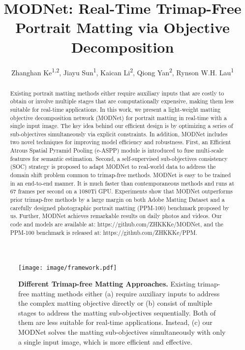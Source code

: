 \documentclass[letterpaper]{article} \usepackage{aaai22}  \usepackage{times}  \usepackage{helvet}  \usepackage{courier}  \usepackage[hyphens]{url}  \usepackage{graphicx} \urlstyle{rm} \def\UrlFont{\rm}  \usepackage{natbib}  \usepackage{caption} \usepackage{booktabs}
\title{MODNet: Real-Time Trimap-Free Portrait Matting via Objective Decomposition}
\author{
    Zhanghan Ke\textsuperscript{\rm 1,2},\;
    Jiayu Sun\textsuperscript{\rm 1},\;
    Kaican Li\textsuperscript{\rm 2},\;
    Qiong Yan\textsuperscript{\rm 2},\;
    Rynson W.H. Lau\textsuperscript{\rm 1}
}
\begin{document}
\maketitle

\begin{abstract}
Existing portrait matting methods either require auxiliary inputs that are costly to obtain or involve multiple stages that are computationally expensive, making them less suitable for real-time applications. 
In this work, we present a light-weight matting objective decomposition network (MODNet) for portrait matting in real-time with a single input image. 
The key idea behind our efficient design is by optimizing a series of sub-objectives simultaneously via explicit constraints. 
In addition, MODNet includes two novel techniques for improving model efficiency and robustness.
First, an Efficient Atrous Spatial Pyramid Pooling (e-ASPP) module is introduced to fuse multi-scale features for semantic estimation. Second, a self-supervised sub-objectives consistency (SOC) strategy is proposed to adapt MODNet to real-world data to address the domain shift problem common to trimap-free methods.
MODNet is easy to be trained in an end-to-end manner. It is much faster than contemporaneous methods and runs at 67 frames per second on a 1080Ti GPU. Experiments show that MODNet outperforms prior trimap-free methods by a large margin on both Adobe Matting Dataset and a carefully designed photographic portrait matting (PPM-100) benchmark proposed by us. Further, MODNet achieves remarkable results on daily photos and videos. Our code and models are available at: {\color{blue} https://github.com/ZHKKKe/MODNet}, and the PPM-100 benchmark is released at: {\color{blue} https://github.com/ZHKKKe/PPM}.
\end{abstract}
\begin{figure*}[t]
    \begin{center}
       \texttt{[image: image/framework.pdf]}
    \end{center}
    \caption{\textbf{Different Trimap-free Matting Approaches.} 
    Existing trimap-free matting methods either (a) require auxiliary inputs to address the complex matting objective directly or (b) consist of multiple stages to address the matting sub-objectives sequentially. Both of them are less suitable for real-time applications.
    Instead, (c) our MODNet solves the matting sub-objectives simultaneously with only a single input image, which is more efficient and effective. 
     }
    \label{fig:framework}
\end{figure*}
\end{document}
